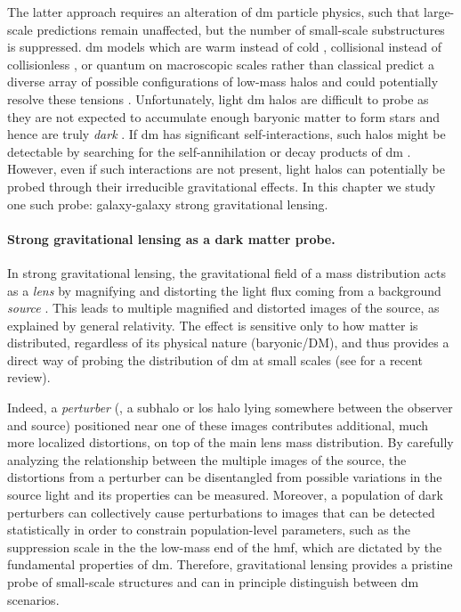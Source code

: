 The latter approach requires an alteration of \gls*{dm} particle physics, such that large-scale predictions remain unaffected, but the number of small-scale substructures is suppressed. \Gls*{dm} models which are warm instead of cold \citep{Colin:2000dn,Hogan:2000bv, Lovell:2013ola}, collisional instead of collisionless \citep{Spergel:1999mh}, or quantum on macroscopic scales rather than classical \citep{Hu:2000ke} predict a diverse array of possible configurations of low-mass halos and could potentially resolve these tensions \citep{Buckley:2017ijx}. Unfortunately, light \gls*{dm} halos are difficult to probe as they are not expected to accumulate enough baryonic matter to form stars and hence are truly \emph{dark} \citep{Efstathiou:1992zz,Fitts:2016usl}. If \gls*{dm} has significant self-interactions, such halos might be detectable by searching for the self-annihilation or decay products of \gls*{dm} \citep{Adhikari:2022sbh}. However, even if such interactions are not present, light halos can potentially be probed through their irreducible gravitational effects. In this chapter we study one such probe: galaxy-galaxy strong gravitational lensing.

\paragraph*{Strong gravitational lensing as a dark matter probe.} In strong gravitational lensing, the gravitational field of a mass distribution acts as a \emph{lens} by magnifying and distorting the light flux coming from a background \emph{source} \citep{Kochanek:aa}. This leads to multiple magnified and distorted images of the source, as explained by general relativity. The effect is sensitive only to how matter is distributed, regardless of its physical nature (baryonic/DM), and thus provides a direct way of probing the distribution of \gls*{dm} at small scales (see \cite{Vegetti:2023mgp} for a recent review). 

Indeed, a \emph{perturber} (\ie, a subhalo or \gls*{los} halo lying somewhere between the observer and source) positioned near one of these images contributes additional, much more localized distortions, on top of the main lens mass distribution. By carefully analyzing the relationship between the multiple images of the source, the distortions from a perturber can be disentangled from possible variations in the source light and its properties can be measured. Moreover, a population of dark perturbers can collectively cause perturbations to images that can be detected statistically in order to constrain population-level parameters, such as the suppression scale in the the low-mass end of the \gls*{hmf}, which are dictated by the fundamental properties of \gls*{dm}. Therefore, gravitational lensing provides a pristine probe of small-scale structures and can in principle distinguish between \gls*{dm} scenarios.


